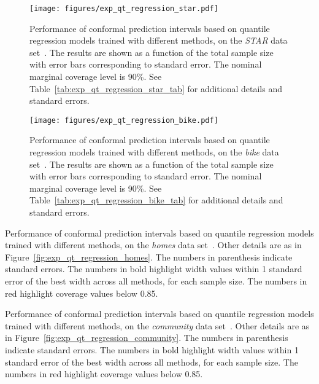 \begin{figure}[!htb]
    \centering
    \texttt{[image: figures/exp\_qt\_regression\_star.pdf]}
    \caption{Performance of conformal prediction intervals based on quantile regression models trained with different methods, on the {\em STAR} data set~\cite{star}. The results are shown as a function of the total sample size with error bars corresponding to standard error. The nominal marginal coverage level is 90\%. See Table~\ref{tab:exp_qt_regression_star_tab} for additional details and standard errors.}
    \label{fig:exp_qt_regression_star}
\end{figure}

\begin{figure}[!htb]
    \centering
    \texttt{[image: figures/exp\_qt\_regression\_bike.pdf]}
    \caption{Performance of conformal prediction intervals based on quantile regression models trained with different methods, on the {\em bike} data set~\cite{data-bike}. The results are shown as a function of the total sample size with error bars corresponding to standard error. The nominal marginal coverage level is 90\%. See Table~\ref{tab:exp_qt_regression_bike_tab} for additional details and standard errors.}
    \label{fig:exp_qt_regression_bike}
\end{figure}

\begin{table}[!htb]
\centering
    \caption{Performance of conformal prediction intervals based on quantile regression models trained with different methods, on the {\em homes} data set~\cite{homes}. Other details are as in Figure~\ref{fig:exp_qt_regression_homes}. The numbers in parenthesis indicate standard errors. The numbers in bold highlight width values within 1 standard error of the best width across all methods, for each sample size. The numbers in red highlight coverage values below 0.85.}
    \label{tab:exp_qt_regression_homes_tab}
  
\end{table}



\begin{table}[!htb]
\centering
    \caption{Performance of conformal prediction intervals based on quantile regression models trained with different methods, on the {\em community} data set~\cite{community}. Other details are as in Figure~\ref{fig:exp_qt_regression_community}. The numbers in parenthesis indicate standard errors. The numbers in bold highlight width values within 1 standard error of the best width across all methods, for each sample size. The numbers in red highlight coverage values below 0.85.}
    \label{tab:exp_qt_regression_community_tab}
  
\end{table}

